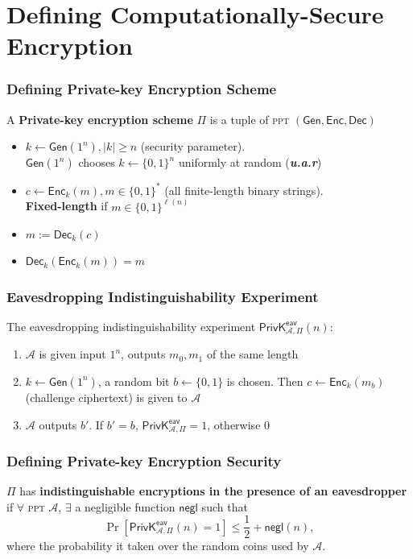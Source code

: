 \section{Defining Computationally-Secure Encryption}
\begin{frame}\frametitle{Defining Private-key Encryption Scheme}
\begin{figure}
\begin{center}

\end{center}
\end{figure}
A \textbf{Private-key encryption scheme} $\Pi$ is a tuple of \textsc{ppt} $(\mathsf{Gen, Enc, Dec})$
\begin{itemize}
\item $k \gets \mathsf{Gen}(1^n), |k|\ge n$ (security parameter). \\
      $\mathsf{Gen}(1^n)$ chooses $k \gets \{0,1\}^n$ uniformly at random (\textbf{\emph{u.a.r}})
\item $c \gets \mathsf{Enc}_k(m), m \in \{0,1\}^*$ (all finite-length binary strings). \\
      \textbf{Fixed-length} if $m \in \{0,1\}^{\ell(n)}$
\item $m := \mathsf{Dec}_k(c)$
\item $\mathsf{Dec}_k(\mathsf{Enc}_k(m)) = m$
\end{itemize}
\end{frame}
\begin{frame}\frametitle{Eavesdropping Indistinguishability Experiment}
The eavesdropping indistinguishability experiment $\mathsf{PrivK}^{\mathsf{eav}}_{\mathcal{A},\Pi}(n)$:
\begin{enumerate}
	\item $\mathcal{A}$ is given input $1^n$, outputs $m_0, m_1$ of the same length
	\item $k \gets \mathsf{Gen}(1^n)$, a random bit $b \gets \{0,1\}$ is chosen. Then $c \gets \mathsf{Enc}_k(m_b)$ (challenge ciphertext) is given to $\mathcal{A}$
	\item $\mathcal{A}$ outputs $b'$. If $b' = b$, $\mathsf{PrivK}^{\mathsf{eav}}_{\mathcal{A},\Pi}=1$, otherwise 0
\end{enumerate}
\begin{figure}
\begin{center}

\end{center}
\end{figure}
\end{frame}
\begin{frame}\frametitle{Defining Private-key Encryption Security}
\begin{definition}\label{def:ind}
$\Pi$ has \textbf{indistinguishable encryptions in the presence of an eavesdropper} if $\forall$ \textsc{ppt} $\mathcal{A}$, $\exists$ a negligible function $\mathsf{negl}$ such that
\[ \Pr\left[\mathsf{PrivK}^{\mathsf{eav}}_{\mathcal{A},\Pi}(n)=1\right] \le \frac{1}{2} + \mathsf{negl}(n),
\]
where the probability it taken over the random coins used by $\mathcal{A}$.
\end{definition}
\end{frame}
